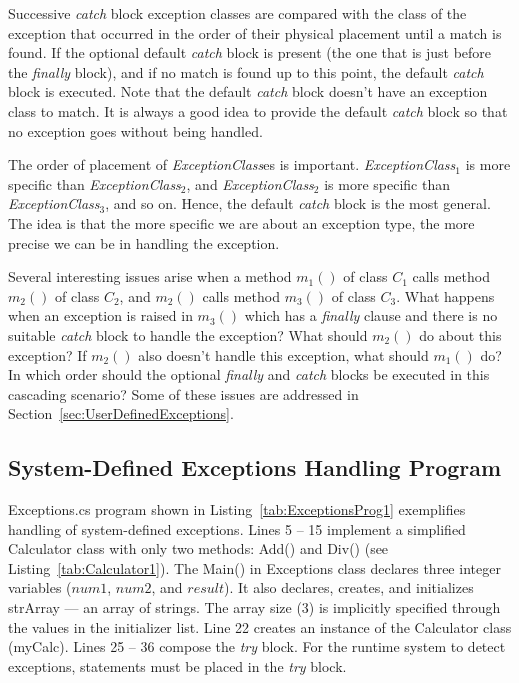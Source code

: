 Successive \emph{catch} block exception classes are compared with
the class of the exception that occurred in the order of their
physical placement until a match is found. If the optional default
\emph{catch} block is present (the one that is just before the
\emph{finally} block), and if no match is found up to this point,
the default \emph{catch} block is executed. Note that the default
\emph{catch} block doesn't have an exception class to match. It is
always a good idea to provide the default \emph{catch} block so
that no exception goes without being handled.

The order of placement of \emph{ExceptionClass}es is important.
\emph{ExceptionClass}$_1$ is more specific than
\emph{ExceptionClass}$_2$, and \emph{ExceptionClass}$_2$ is more
specific than \emph{ExceptionClass}$_3$, and so on. Hence, the
default \emph{catch} block is the most general. The idea is that
the more specific we are about an exception type, the more precise
we can be in handling the exception.

Several interesting issues arise when a method $m_1()$ of class
$C_1$ calls method $m_2()$ of class $C_2$, and $m_2()$ calls
method $m_3()$ of class $C_3$. What happens when an exception is
raised in $m_3()$ which has a \emph{finally} clause and there is
no suitable \emph{catch} block to handle the exception? What
should $m_2()$ do about this exception? If $m_2()$ also doesn't
handle this exception, what should $m_1()$ do? In which order
should the optional \emph{finally} and \emph{catch} blocks be
executed in this cascading scenario? Some of these issues are
addressed in Section~\ref{sec:UserDefinedExceptions}.


\subsection{System-Defined Exceptions Handling Program}

Exceptions.cs program shown in Listing~\ref{tab:ExceptionsProg1}
exemplifies handling of system-defined exceptions. Lines 5 -- 15
implement a simplified Calculator class with only two methods:
Add() and Div() (see Listing~\ref{tab:Calculator1}). The Main() in
Exceptions class declares three integer variables ($num1$, $num2$,
and $result$). It also declares, creates, and initializes strArray
--- an array of strings. The array size (3) is implicitly
specified through the values in the initializer list. Line 22
creates an instance of the Calculator class (myCalc). Lines 25 --
36 compose the \emph{try} block. For the runtime system to detect
exceptions, statements must be placed in the \emph{try} block.


